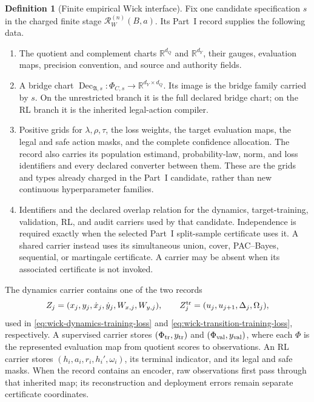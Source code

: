 \documentclass[11pt]{article}
\numberwithin{section}{part}
\theoremstyle{plain}
\theoremstyle{definition}
\newtheorem{definition}[definition]{Definition}
\theoremstyle{remark}
\begin{document}
\begin{definition}[Finite empirical Wick interface]
\label{def:wick-finite-empirical-interface}
Fix one candidate specification \(s\) in the charged finite stage
\(\mathscr R_W^{(n)}(B,a)\).  Its Part~I record supplies the following data.
\begin{enumerate}[label=\textup{(\roman*)}]
\item The quotient and complement charts
      \(\mathbb R^{d_Q}\) and \(\mathbb R^{d_Y}\), their gauges, evaluation
      maps, precision convention, and source and authority fields.
\item A bridge chart
      \(\operatorname{Dec}_{\mathfrak A,s}:\Phi_{C,s}\to
      \mathbb R^{d_Y\times d_Q}\).  Its image is the bridge family carried by
      \(s\).  On the unrestricted branch it is the full declared bridge
      chart; on the RL branch it is the inherited legal-action compiler.
\item Positive grids for \(\lambda,\rho,\tau\), the loss weights, the target
      evaluation maps, the legal and safe action masks, and the complete
      confidence allocation.  The record also carries its population
      estimand, probability-law, norm, and loss identifiers and every
      declared converter between them.  These are the grids and types already
      charged in the Part~I candidate, rather than new continuous
      hyperparameter families.
\item Identifiers and the declared overlap relation for the dynamics,
      target-training, validation, RL, and audit carriers used by that
      candidate.  Independence is required exactly when the selected Part~I
      split-sample certificate uses it.  A shared carrier instead uses its
      simultaneous union, cover, PAC--Bayes, sequential, or martingale
      certificate.  A carrier may be absent when its associated certificate
      is not invoked.
\end{enumerate}
The dynamics carrier contains one of the two records
\[
 Z_j=(x_j,y_j,\dot x_j,\dot y_j,W_{x,j},W_{y,j}),
 \qquad
 Z_j^{\rm tr}=(u_j,u_{j+1},\Delta_j,\Omega_j),
\]
used in \eqref{eq:wick-dynamics-training-loss} and
\eqref{eq:wick-transition-training-loss}, respectively.  A supervised carrier stores
\((\Phi_{\rm tr},y_{\rm tr})\) and
\((\Phi_{\rm val},y_{\rm val})\), where each \(\Phi\) is the represented
evaluation map from quotient scores to observations.  An RL carrier stores
\((h_i,a_i,r_i,h_i',\omega_i)\), its terminal indicator, and its legal and
safe masks.  When the record contains an encoder, raw observations first pass
through that inherited map; its reconstruction and deployment errors remain
separate certificate coordinates.


\end{definition}
\end{document}
